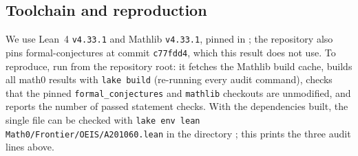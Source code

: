 \documentclass[11pt]{amsart}
\theoremstyle{plain}
\theoremstyle{definition}
\begin{document}
\subsection*{Toolchain and reproduction}
We use Lean~4 \cite{Lean4} \texttt{v4.33.1} and Mathlib \cite{Mathlib} \texttt{v4.33.1}, pinned in ; the repository also pins formal-conjectures \cite{FC} at commit \texttt{c77fdd4}, which this result does not use. To reproduce, run  from the repository root: it fetches the Mathlib build cache, builds all math0 results with \texttt{lake build} (re-running every audit command), checks that the pinned \texttt{formal\_conjectures} and \texttt{mathlib} checkouts are unmodified, and reports the number of passed statement checks. With the dependencies built, the single file can be checked with \texttt{lake env lean Math0/Frontier/OEIS/A201060.lean} in the directory ; this prints the three audit lines above.
\end{document}
